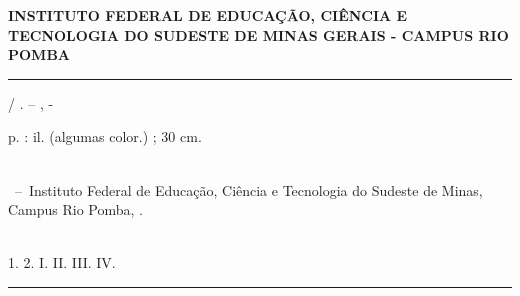 \documentclass[
	12pt,				%
	openright,			%
	oneside,			%
	a4paper,			%
	english,			%
	french,				%
	spanish,			%
	brazil,				%
	]{abntex2}
\begin{document}
\frenchspacing 


\begin{center}
\textbf{ 
INSTITUTO FEDERAL DE EDUCAÇÃO, CIÊNCIA E TECNOLOGIA DO SUDESTE DE MINAS GERAIS - CAMPUS RIO POMBA}
\end{center}

\imprimircapa

\imprimirfolhaderosto*


%
%     
\begin{fichacatalografica}
	\vspace*{\fill}					%
	\hrule							%
	\begin{center}					%
	\begin{minipage}[c]{12.5cm}		%
	
	\imprimirautor
	
	\hspace{0.5cm} \imprimirtitulo  / \imprimirautor. --
	\imprimirlocal, \imprimirdata-
	
	\hspace{0.5cm} \pageref{LastPage} p. : il. (algumas color.) ; 30 cm.\\
	
	\hspace{0.5cm} \imprimirorientadorRotulo~\imprimirorientador\\
	
	\hspace{0.5cm}
	\parbox[t]{\textwidth}{\imprimirtipotrabalho~--~Instituto Federal de Educação, Ciência e Tecnologia do Sudeste de Minas, Campus Rio Pomba,
	\imprimirdata.}\\
	
	\hspace{0.5cm}
		1. 
		2. 
		I. 
		II.
		III.
		IV. \\ 			
	
	\hspace{8.75cm} %
	
	\end{minipage}
	\end{center}
	\hrule
\end{fichacatalografica}
\end{document}
